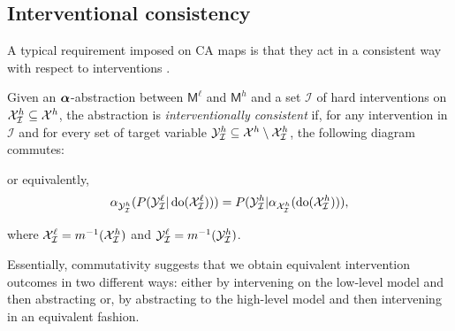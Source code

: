 \subsection{Interventional consistency}
A typical requirement imposed on CA maps is that they act in a consistent way with respect to interventions . 

\begin{definition}\label{def:interv_consistency}
    Given an $\boldsymbol{\alpha}$-abstraction between $\mathsf{M}^\ell$ and $\mathsf{M}^h$ and a set $\mathcal{I}$ of hard interventions on $\mathcal{X}^h_{\mathcal{I}}\subseteq \mathcal{X}^h$, the abstraction is \emph{interventionally consistent} if, for any intervention in $\mathcal{I}$ and for every set of target variable $\mathcal{Y}^h_{\mathcal{I}}\subseteq \mathcal{X}^h \setminus \mathcal{X}^h_{\mathcal{I}}$, the following diagram commutes:

    \begin{center}
    \end{center}
    or equivalently,
    \begin{equation}%
        \alphamap{\mathcal{Y}^h_\mathcal{I}}(P(\mathcal{Y}^\ell_\mathcal{I} \vert \doint(\mathcal{X}^\ell_\mathcal{I}))) =  P(\mathcal{Y}^h_\mathcal{I} \vert \alphamap{\mathcal{X}^h_\mathcal{I}}(\doint(\mathcal{X}^h_\mathcal{I}))),
    \end{equation}

    where $\mathcal{X}^\ell_\mathcal{I}=m^{-1}(\mathcal{X}^h_\mathcal{I})$ and $\mathcal{Y}^\ell_\mathcal{I}=m^{-1}(\mathcal{Y}^h_\mathcal{I})$.  
\end{definition} 
Essentially, commutativity suggests that we obtain equivalent intervention outcomes in two different ways:  either by intervening on the low-level model and then abstracting or,  by abstracting to the high-level model and then intervening in an equivalent fashion.

